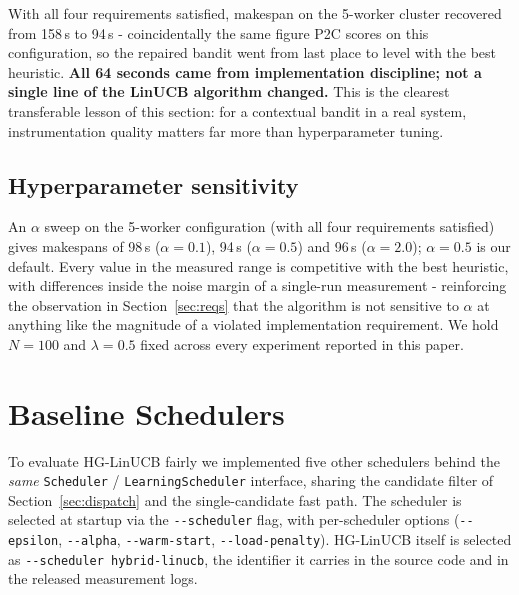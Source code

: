 \documentclass[final,5p,times,twocolumn]{elsarticle}
\begin{document}
With all four requirements satisfied, makespan on the 5-worker cluster recovered from 158\,s to 94\,s - coincidentally the same figure P2C scores on this configuration, so the repaired bandit went from last place to level with the best heuristic. \textbf{All 64 seconds came from implementation discipline; not a single line of the LinUCB algorithm changed.} This is the clearest transferable lesson of this section: for a contextual bandit in a real system, instrumentation quality matters far more than hyperparameter tuning.

\subsection{Hyperparameter sensitivity}
\label{sec:sensitivity}

An $\alpha$ sweep on the 5-worker configuration (with all four requirements satisfied) gives makespans of 98\,s ($\alpha=0.1$), 94\,s ($\alpha=0.5$) and 96\,s ($\alpha=2.0$); $\alpha=0.5$ is our default. Every value in the measured range is competitive with the best heuristic, with differences inside the noise margin of a single-run measurement - reinforcing the observation in Section~\ref{sec:reqs} that the algorithm is not sensitive to $\alpha$ at anything like the magnitude of a violated implementation requirement. We hold $N=100$ and $\lambda=0.5$ fixed across every experiment reported in this paper.

\section{Baseline Schedulers}
\label{sec:baselines}

To evaluate HG-LinUCB fairly we implemented five other schedulers behind the \emph{same} \texttt{Scheduler} / \texttt{LearningScheduler} interface, sharing the candidate filter of Section~\ref{sec:dispatch} and the single-candidate fast path. The scheduler is selected at startup via the \texttt{-{}-scheduler} flag, with per-scheduler options (\texttt{-{}-epsilon}, \texttt{-{}-alpha}, \texttt{-{}-warm-start}, \texttt{-{}-load-penalty}). HG-LinUCB itself is selected as \texttt{-{}-scheduler hybrid-linucb}, the identifier it carries in the source code and in the released measurement logs.
\end{document}
